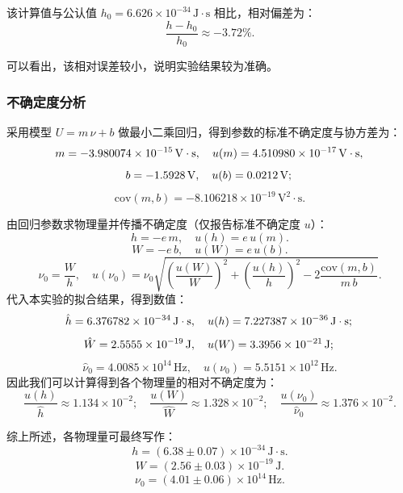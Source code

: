 \documentclass[]{../../templates/Report}%
\begin{document}
\begin{fullreportonly}
该计算值与公认值 $h_0=6.626\times 10^{-34}\,\mathrm{J\cdot s}$ 相比，相对偏差为：
\begin{equation}
    \frac{h-h_0}{h_0}\approx -3.72\% .
\end{equation}

可以看出，该相对误差较小，说明实验结果较为准确。

\subsubsection{不确定度分析}
采用模型 $U=m\,\nu+b$ 做最小二乘回归，得到参数的标准不确定度与协方差为：
\[
    m = -3.980074\times 10^{-15}\,\mathrm{V\cdot s},\quad u(m)=4.510980\times 10^{-17}\,\mathrm{V\cdot s},\\
\]
\[
    b = -1.5928\,\mathrm{V},\quad u(b)=0.0212\,\mathrm{V};\\
\]
\[
    \mathrm{cov}(m,b) = -8.106218\times 10^{-19}\,\mathrm{V^2\cdot s} .
\]

由回归参数求物理量并传播不确定度（仅报告标准不确定度 $u$）：
\[
    h=-e\,m,\quad u(h)=e\,u(m).
\]
\[
    W=-e\,b,\quad u(W)=e\,u(b).
\]
\[
    \nu_0=\frac{W}{h},\quad u(\nu_0)=\nu_0\sqrt{\left(\frac{u(W)}{W}\right)^2+\left(\frac{u(h)}{h}\right)^2-2\frac{\mathrm{cov}(m,b)}{m\,b}} .
\]
代入本实验的拟合结果，得到数值：
\[
    \hat h=6.376782\times 10^{-34}\,\mathrm{J\cdot s},\quad u(h)=7.227387\times 10^{-36}\,\mathrm{J\cdot s};\\
\]
\[
    \hat W=2.5555\times 10^{-19}\,\mathrm{J},\quad u(W)=3.3956\times 10^{-21}\,\mathrm{J};\\
\]
\[
    \hat \nu_0=4.0085\times 10^{14}\,\mathrm{Hz},\quad u(\nu_0)=5.5151\times 10^{12}\,\mathrm{Hz} .
\]
因此我们可以计算得到各个物理量的相对不确定度为：
\[
    \frac{u(h)}{\hat h}\approx 1.134\times 10^{-2} ;\quad
    \frac{u(W)}{\hat W}\approx 1.328\times 10^{-2} ;\quad
    \frac{u(\nu_0)}{\hat \nu_0}\approx 1.376\times 10^{-2} .
\]

综上所述，各物理量可最终写作：
\begin{equation}
    \boxed{h=(6.38 \pm 0.07)\times 10^{-34}\,\mathrm{J\cdot s}} .
\end{equation}
\begin{equation}
    \boxed{W=(2.56 \pm 0.03)\times 10^{-19}\,\mathrm{J}} .
\end{equation}
\begin{equation}
    \boxed{\nu_0=(4.01 \pm 0.06)\times 10^{14}\,\mathrm{Hz}} .
\end{equation}


\end{fullreportonly}
\end{document}
